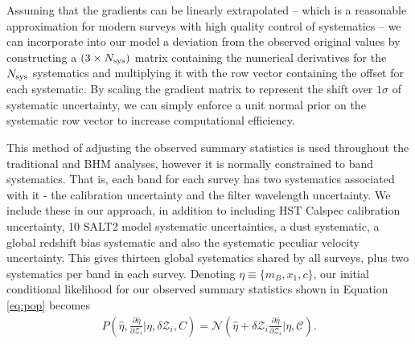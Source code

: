 \documentclass[a4paper,fleqn,usenatbib]{mnras}
\newcommand{\cov}{\mathcal{C}}
\newcommand{\Z}{\mathcal{Z}}
\begin{document}
Assuming that the gradients can be linearly extrapolated -- which is a reasonable approximation for modern surveys with high quality control of systematics -- we can incorporate into our model a deviation from the observed original values by constructing a $(3 \times N_{\rm sys})$ matrix containing the numerical derivatives for the $N_{\rm sys}$ systematics and multiplying it with the row vector containing the offset for each systematic. By scaling the gradient matrix to represent the shift over $1\sigma$ of systematic uncertainty, we can simply enforce a unit normal prior on the systematic row vector to increase computational efficiency.

This method of adjusting the observed summary statistics is used throughout the traditional and BHM analyses, however it is normally constrained to band systematics. That is, each band for each survey has two systematics associated with it - the calibration uncertainty and the filter wavelength uncertainty. We include these in our approach, in addition to including HST Calspec calibration uncertainty, 10 SALT2 model systematic uncertainties, a dust systematic, a global redshift bias systematic and also the systematic peculiar velocity uncertainty. This gives thirteen global systematics shared by all surveys, plus two systematics per band in each survey. Denoting $\eta \equiv \lbrace m_B, x_1, c \rbrace$, our initial conditional likelihood for our observed summary statistics shown in Equation \eqref{eq:pop} becomes
\begin{align}
P(\hat{\eta}, \frac{\partial \hat{\eta}}{\partial \Z_i} | \eta, \delta \Z_i, C) = \mathcal{N}(\hat{\eta} + \delta \Z_i \frac{\partial \hat{\eta}}{\partial \Z_i}|\eta,\cov). \label{eq:l3}
\end{align}
\end{document}
